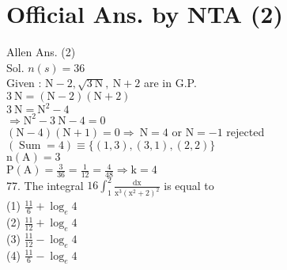 \documentclass[10pt]{article}
\begin{document}
\section*{Official Ans. by NTA (2)}
Allen Ans. (2)\\
Sol. \(n(s)=36\)\\
Given : \(\mathrm{N}-2, \sqrt{3 \mathrm{~N}}, \mathrm{~N}+2\) are in G.P.\\
\(3 \mathrm{~N}=(\mathrm{N}-2)(\mathrm{N}+2)\)\\
\(3 \mathrm{~N}=\mathrm{N}^{2}-4\)\\
\(\Rightarrow \mathrm{N}^{2}-3 \mathrm{~N}-4=0\)\\
\((\mathrm{N}-4)(\mathrm{N}+1)=0 \Rightarrow \mathrm{~N}=4\) or \(\mathrm{N}=-1\) rejected\\
\((\operatorname{Sum}=4) \equiv\{(1,3),(3,1),(2,2)\}\)\\
\(\mathrm{n}(\mathrm{A})=3\)\\
\(\mathrm{P}(\mathrm{A})=\frac{3}{36}=\frac{1}{12}=\frac{4}{48} \Rightarrow \mathrm{k}=4\)\\
77. The integral \(16 \int_{1}^{2} \frac{\mathrm{dx}}{\mathrm{x}^{3}\left(\mathrm{x}^{2}+2\right)^{2}}\) is equal to\\
(1) \(\frac{11}{6}+\log _{e} 4\)\\
(2) \(\frac{11}{12}+\log _{e} 4\)\\
(3) \(\frac{11}{12}-\log _{e} 4\)\\
(4) \(\frac{11}{6}-\log _{e} 4\)
\end{document}
